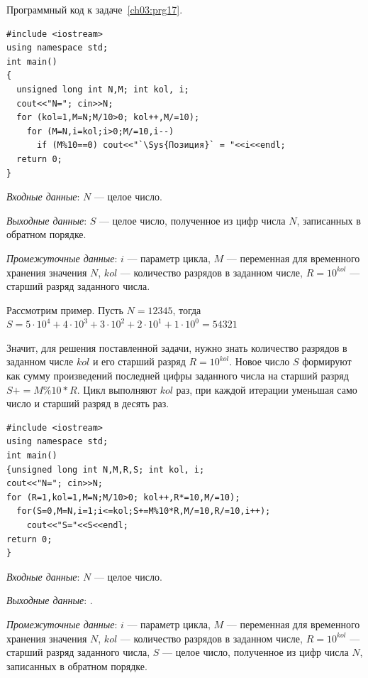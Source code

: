Программный код к задаче~\ref{ch03:prg17}.
\begin{lstlisting}
#include <iostream>
using namespace std;
int main()
{
  unsigned long int N,M; int kol, i;
  cout<<"N="; cin>>N;
  for (kol=1,M=N;M/10>0; kol++,M/=10);
    for (M=N,i=kol;i>0;M/=10,i--)
      if (M%10==0) cout<<"`\Sys{Позиция}` = "<<i<<endl;
  return 0;
}
\end{lstlisting}


\emph{Входные данные}: $N$ --- целое число.

\emph{Выходные данные}: $S$ --- целое число, полученное из цифр числа $N$, записанных в обратном порядке.

\emph{Промежуточные данные}: $i$ --- параметр цикла, $M$ --- переменная для
временного хранения значения $N$, $kol$ --- количество разрядов в заданном числе, 
$R=10^{kol}$ --- старший разряд заданного числа.

Рассмотрим пример. Пусть $N=12345$, тогда 
$S=5\cdot 10^4+4\cdot 10^3+3\cdot 10^2+2\cdot 10^1+1\cdot 10^0=54321$

Значит, для решения поставленной задачи, нужно знать количество
разрядов в заданном числе $kol$ и его старший разряд $R=10^{kol}$.
Новое число $S$ формируют как сумму произведений
последней цифры заданного числа на старший разряд $S+=M\%10*R$. Цикл выполняют
$kol$ раз, при каждой итерации уменьшая само число и старший разряд в десять раз.
\begin{lstlisting}
#include <iostream>
using namespace std;
int main()
{unsigned long int N,M,R,S; int kol, i;
cout<<"N="; cin>>N;
for (R=1,kol=1,M=N;M/10>0; kol++,R*=10,M/=10);
  for(S=0,M=N,i=1;i<=kol;S+=M%10*R,M/=10,R/=10,i++);
    cout<<"S="<<S<<endl;
return 0;
}
\end{lstlisting}

%

\emph{Входные данные}: $N$ --- целое число.

\emph{Выходные данные}: . 

\emph{Промежуточные данные}: $i$ --- параметр цикла, $M$ --- переменная для
временного хранения значения $N$, $kol$ --- количество разрядов в заданном числе,
$R=10^{kol}$ --- старший разряд заданного числа, $S$ --- целое число, полученное 
из цифр числа $N$, записанных в обратном порядке.

